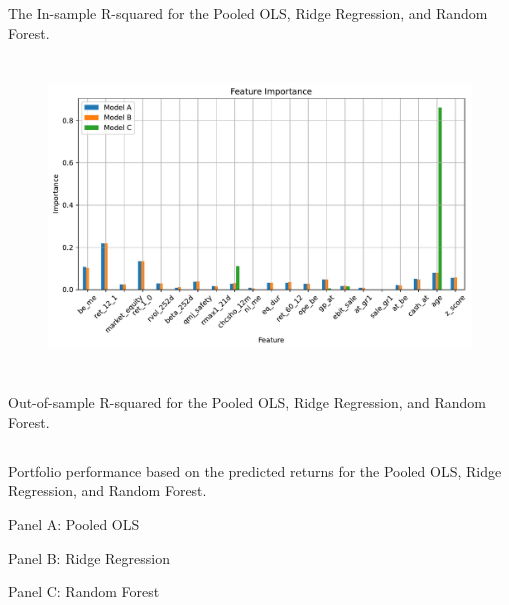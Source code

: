 \documentclass[hidelinks,12pt]{article}
\begin{document}
\subsection{}
\begin{table}[htbp]
    \centering
    \caption{The In-sample R-squared for the Pooled OLS, Ridge Regression, and Random Forest.}
    \resizebox{!}{!}{}
\end{table}

\FloatBarrier
\section{}

\begin{figure}[htbp]
    \centering
    \includegraphics[width=.75\textwidth]{out/6_4.pdf}
\end{figure}
\FloatBarrier
\section{}
\subsection{}
\begin{table}[htbp]
    \centering
    \caption{Out-of-sample R-squared for the Pooled OLS, Ridge Regression, and Random Forest.}
    \resizebox{!}{!}{}
\end{table}
\FloatBarrier
\subsection{}
\begin{table}[htbp]
    \centering
    \caption{Portfolio performance based on the predicted returns for the Pooled OLS, Ridge Regression, and Random Forest.}
    \caption*{\scriptsize\textmd{Panel A: Pooled OLS}}
    \resizebox{0.65\textwidth}{!}{}
    
    \vspace{0.5cm} %
    
    \caption*{\scriptsize\textmd{Panel B: Ridge Regression}}
    \resizebox{0.65\textwidth}{!}{}
    
    \vspace{0.5cm} %
    
    \caption*{\scriptsize\textmd{Panel C: Random Forest}}
    \resizebox{0.65\textwidth}{!}{}
\end{table}
\FloatBarrier
\end{document}
